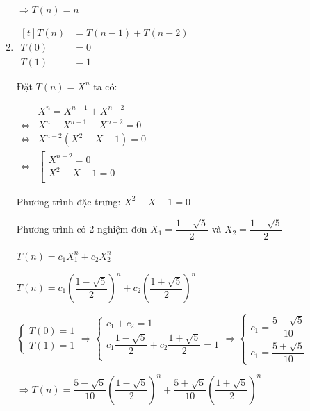 \documentclass[12pt, letterpaper]{article}
\begin{document}
\begin{enumerate}
        $ \Rightarrow T(n) = n $
    \item $ \begin{aligned}[t]
            T(n) &= T(n - 1) + T(n - 2) \\
            T(0) &= 0 \\
            T(1) &= 1
    \end{aligned} $

        Đặt $ T(n) = X^n $ ta có:

        $ \begin{aligned}
            & X^n = X^{n - 1} + X^{n - 2} \\
            \Leftrightarrow & X^n - X^{n - 1} - X^{n - 2} = 0 \\
            \Leftrightarrow & X^{n - 2}(X^2 - X - 1) = 0 \\
            \Leftrightarrow & \left[
            \begin{array}{ll}
                X^{n - 2} = 0 \\
                X^2 - X - 1 = 0 \\
            \end{array}
            \right .
        \end{aligned} $

        Phương trình đặc trưng: $ X^2 - X - 1  = 0 $

        Phương trình có 2 nghiệm đơn $ X_1 = \dfrac{1 - \sqrt{5}}{2} $ và $ X_2 = \dfrac{1 + \sqrt{5}}{2}  $

        $ T(n) = c_1X_1^n + c_2X_2^n $

        $ T(n) = c_1 {\left(\dfrac{1 - \sqrt{5}}{2}\right)}^n + c_2 {\left(\dfrac{1 + \sqrt{5}}{2}\right)}^n $

        $ \begin{cases}
            T(0) = 1 \\
            T(1) = 1
        \end{cases}
        \Rightarrow{}
        \begin{cases}
            c_1 + c_2 = 1 \\
            c_1 \dfrac{1 - \sqrt{5}}{2} + c_2 \dfrac{1 + \sqrt{5}}{2} = 1 \\
        \end{cases}
        \Rightarrow{}
        \begin{cases}
            c_1 = \dfrac{5 - \sqrt{5}}{10} \\
            c_1 = \dfrac{5 + \sqrt{5}}{10}
        \end{cases} $

        $ \Rightarrow T(n) = \dfrac{5 - \sqrt{5}}{10} {\left(\dfrac{1 - \sqrt{5}}{2}\right)}^n + \dfrac{5 + \sqrt{5}}{10} {\left(\dfrac{1 + \sqrt{5}}{2}\right)}^n  $

\end{enumerate}
\end{document}
